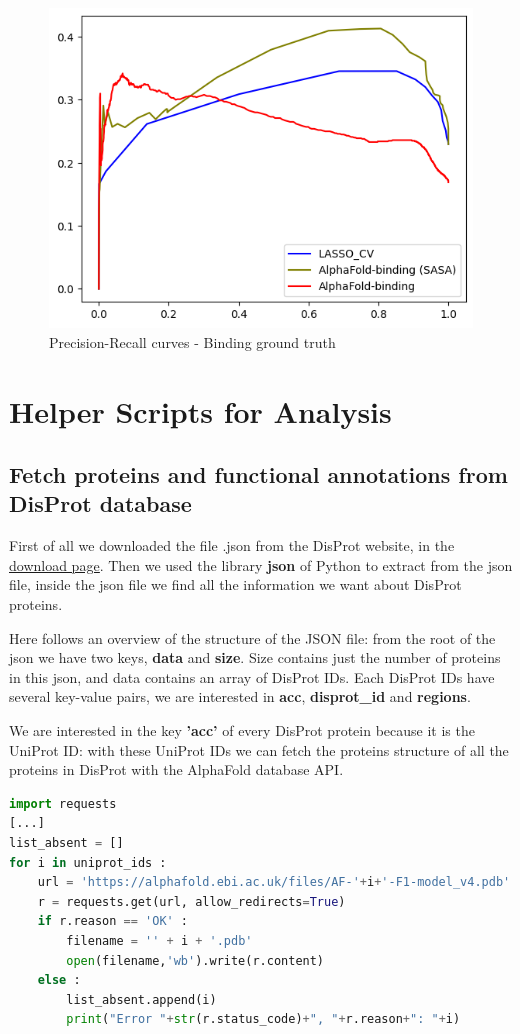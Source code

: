 \begin{figure}[h!]
    \centering
    \includegraphics[scale = 0.75]{res/ML/precisionrecall-binding.png}
    \caption{Precision-Recall curves - Binding ground truth}
\end{figure}

\pagebreak

\section{Helper Scripts for Analysis}\label{analysis-procedures}
\subsection{Fetch proteins and functional annotations from DisProt database}
First of all we downloaded the file .json from the DisProt website, in the \href{https://disprot.org/download}{\underline{download page}}. Then we used the library \textbf{json} of Python to extract from the json file, inside the json file we find all the information we want about DisProt proteins. 

Here follows an overview of the structure of the JSON file: from the root of the json we have two keys, \textbf{data} and \textbf{size}. Size contains just the number of proteins in this json, and data contains an array of DisProt IDs. Each DisProt IDs have several key-value pairs, we are interested in \textbf{acc}, \textbf{disprot\_id} and \textbf{regions}.

We are interested in the key \textbf{'acc'} of every DisProt protein because it is the UniProt ID: with these UniProt IDs we can fetch the proteins structure of all the proteins in DisProt with the AlphaFold database API.
\begin{lstlisting}[language=Python, caption=Script to use AlphaFold database API]
import requests
[...]
list_absent = []
for i in uniprot_ids :
    url = 'https://alphafold.ebi.ac.uk/files/AF-'+i+'-F1-model_v4.pdb'
    r = requests.get(url, allow_redirects=True)
    if r.reason == 'OK' :
        filename = '' + i + '.pdb'
        open(filename,'wb').write(r.content)
    else :
        list_absent.append(i)
        print("Error "+str(r.status_code)+", "+r.reason+": "+i)
\end{lstlisting}

